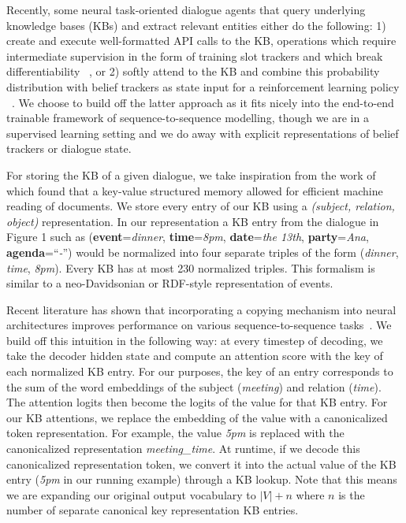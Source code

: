 \documentclass[11pt,a4paper]{article}
\begin{document}
  Recently, some neural task-oriented dialogue agents that query underlying knowledge bases (KBs) and extract relevant entities either do the following: 1) create and execute well-formatted API calls to the KB, operations which require intermediate supervision in the form of training slot trackers and which break differentiability ~\cite{Wen:16}, or 2) softly attend to the KB and combine this probability distribution with belief trackers as state input for a reinforcement learning policy ~\cite{Dhingra:16}. We choose to build off the latter approach as it fits nicely into the end-to-end trainable framework of sequence-to-sequence modelling, though we are in a supervised learning setting and we do away with explicit representations of belief trackers or dialogue state. 

  For storing the KB of a given dialogue, we take inspiration from the work of ~\cite{miller-EtAl:2016:EMNLP2016} which found that a key-value structured memory allowed for efficient machine reading of documents. We store every entry of our KB using a \emph{(subject, relation, object)} representation. In our representation a KB entry from the dialogue in Figure 1 such as (\textbf{event}=\emph{dinner}, \textbf{time}=\emph{8pm}, \textbf{date}=\emph{the 13th}, \textbf{party}=\emph{Ana}, \textbf{agenda}=``\emph{-}'') would be normalized into four separate triples of the form (\emph{dinner}, \emph{time}, \emph{8pm}). Every KB has at most 230 normalized triples. This formalism is similar to a neo-Davidsonian or RDF-style representation of events.

  Recent literature has shown that incorporating a copying mechanism into neural architectures improves performance on various sequence-to-sequence tasks~\cite{jia-liang:2016:P16-1,gu-EtAl:2016:P16-1,ling-EtAl:2016:P16-1,gulcehre-EtAl:2016:P16-1,E17-2075}. We build off this intuition in the following way: at every timestep of decoding, we take the decoder hidden state and compute an attention score with the key of each normalized KB entry. For our purposes, the key of an entry corresponds to the sum of the word embeddings of the subject (\emph{meeting}) and relation (\emph{time}). The attention logits then become the logits of the value for that KB entry. For our KB attentions, we replace the embedding of the value with a canonicalized token representation. For example, the value \emph{5pm} is replaced with the canonicalized representation \emph{meeting\_time}. At runtime, if we decode this canonicalized representation token, we convert it into the actual value of the KB entry (\emph{5pm} in our running example) through a KB lookup. Note that this means we are expanding our original output vocabulary to $|V| + n$ where $n$ is the number of separate canonical key representation KB entries. 
\end{document}
